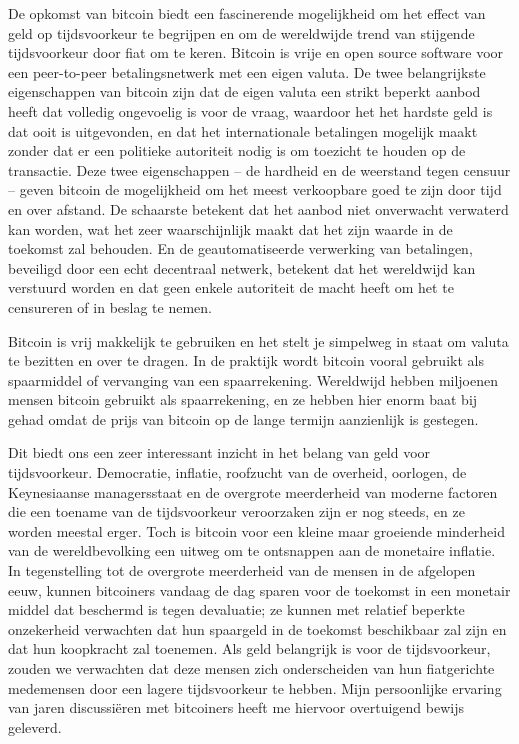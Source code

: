 De opkomst van bitcoin biedt een fascinerende mogelijkheid om het effect van geld op tijdsvoorkeur te begrijpen en om de wereldwijde trend van stijgende tijdsvoorkeur door fiat om te keren. Bitcoin is vrije en open source software voor een peer-to-peer betalingsnetwerk met een eigen valuta. De twee belangrijkste eigenschappen van bitcoin zijn dat de eigen valuta een strikt beperkt aanbod heeft dat volledig ongevoelig is voor de vraag, waardoor het het hardste geld is dat ooit is uitgevonden, en dat het internationale betalingen mogelijk maakt zonder dat er een politieke autoriteit nodig is om toezicht te houden op de transactie. Deze twee eigenschappen -- de hardheid en de weerstand tegen censuur -- geven bitcoin de mogelijkheid om het meest verkoopbare goed te zijn door tijd en over afstand. De schaarste betekent dat het aanbod niet onverwacht verwaterd kan worden, wat het zeer waarschijnlijk maakt dat het zijn waarde in de toekomst zal behouden. En de geautomatiseerde verwerking van betalingen, beveiligd door een echt decentraal netwerk, betekent dat het wereldwijd kan verstuurd worden en dat geen enkele autoriteit de macht heeft om het te censureren of in beslag te nemen.

Bitcoin is vrij makkelijk te gebruiken en het stelt je simpelweg in staat om valuta te bezitten en over te dragen. In de praktijk wordt bitcoin vooral gebruikt als spaarmiddel of vervanging van een spaarrekening. Wereldwijd hebben miljoenen mensen bitcoin gebruikt als spaarrekening, en ze hebben hier enorm baat bij gehad omdat de prijs van bitcoin op de lange termijn aanzienlijk is gestegen.

Dit biedt ons een zeer interessant inzicht in het belang van geld voor tijdsvoorkeur. Democratie, inflatie, roofzucht van de overheid, oorlogen, de Keynesiaanse managersstaat en de overgrote meerderheid van moderne factoren die een toename van de tijdsvoorkeur veroorzaken zijn er nog steeds, en ze worden meestal erger. Toch is bitcoin voor een kleine maar groeiende minderheid van de wereldbevolking een uitweg om te ontsnappen aan de monetaire inflatie. In tegenstelling tot de overgrote meerderheid van de mensen in de afgelopen eeuw, kunnen bitcoiners vandaag de dag sparen voor de toekomst in een monetair middel dat beschermd is tegen devaluatie; ze kunnen met relatief beperkte onzekerheid verwachten dat hun spaargeld in de toekomst beschikbaar zal zijn en dat hun koopkracht zal toenemen. Als geld belangrijk is voor de tijdsvoorkeur, zouden we verwachten dat deze mensen zich onderscheiden van hun fiatgerichte medemensen door een lagere tijdsvoorkeur te hebben. Mijn persoonlijke ervaring van jaren discussiëren met bitcoiners heeft me hiervoor overtuigend bewijs geleverd.

